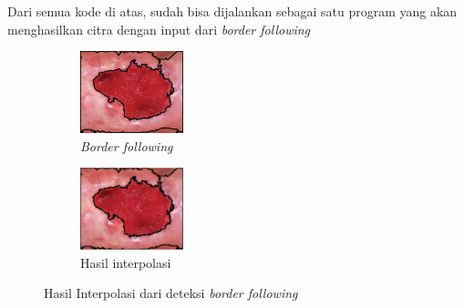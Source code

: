 Dari semua kode di atas, sudah bisa dijalankan 
sebagai satu program yang akan menghasilkan citra 
dengan input dari \textit{border following}
\begin{figure}[H]
	\centering
	\begin{subfigure}{.3\textwidth}
		\centering
		\includegraphics[keepaspectratio, width=3cm]{gambar/Bab4/Luka_merah_interpolasi.jpg}
		\caption{\textit{Border following}}
	\end{subfigure}
	\begin{subfigure}{.4\textwidth}
		\centering
		\includegraphics[keepaspectratio, width=3cm]{gambar/Bab4/Luka_merah_Globalinterpolasi.jpg}
		\caption{Hasil interpolasi}
	\end{subfigure} 
	\caption{Hasil Interpolasi dari deteksi \textit{border following}}
\end{figure}

